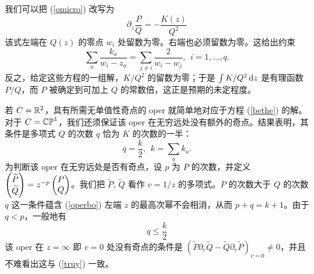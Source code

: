 我们可以把 (\ref{omicro}) 改写为
\begin{equation}\label{operbo}
\partial_z \frac{P}{Q}  =- \frac{K(z)}{Q^2}
\end{equation}
该式左端在 $Q(z)$ 的零点 $w_i$ 处留数为零。右端也必须留数为零。这给出约束
\begin{equation}\label{bethe}
\sum_a \frac{k_a}{w_i - z_a} = \sum_{j\not=i} \frac{2}{w_i - w_j},~~i=1,\dots,q.\end{equation}
反之，给定这些方程的一组解，$K/Q^2$ 的留数为零；于是 $\int K/Q^2\, \d z$ 是有理函数 $P/Q$，而 $P$ 被确定到可加上 $Q$ 的常数倍，这正是预期的未定程度。

若 $C=\R^2$，具有所需无单值性奇点的 oper 就简单地对应于方程 (\ref{bethe}) 的解。对于 $C=\CP^1$，我们还须保证该 oper 在无穷远处没有额外的奇点。结果表明，其条件是多项式 $Q$ 的次数 $q$ 恰为 $K$ 的次数的一半：
\begin{equation}\label{truy} q=\frac{k}{2},~~k=\sum_a k_a. \end{equation}
为判断该 oper 在无穷远处是否有奇点，设 $p$ 为 $P$ 的次数，并定义 $\begin{pmatrix}\tilde P\cr \tilde Q\end{pmatrix}=
z^{-p}\begin{pmatrix}P\cr Q\end{pmatrix}$。我们把 $\tilde P,\,\tilde Q$ 看作 $v=1/z$ 的多项式。$P$ 的次数大于 $Q$ 的次数 $q$ 这一条件蕴含 (\ref{operbo}) 左端 $z$ 的最高次幂不会相消，从而 $p+q=k+1$。由于 $q<p$，一般地有
\begin{equation}\label{ruy} q\leq \frac{k}{2}\end{equation}
该 oper 在 $z=\infty$ 即 $v=0$ 处没有奇点的条件是 $\left(\tilde P\partial_v\tilde Q-\tilde Q\partial_v\tilde P\right)_{v=0}\not=0$，并且不难看出这与 (\ref{truy}) 一致。

